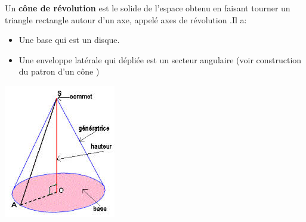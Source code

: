         
Un \textbf{\og cône de révolution \fg{}} est le solide de l'espace obtenu en faisant tourner un triangle rectangle autour d'un axe, appelé \og axes de révolution \fg{}.Il a:
\begin{itemize}
\item Une base qui est un disque.
\item Une enveloppe latérale qui \og dépliée \fg{}  est un secteur angulaire (voir \og construction du patron d'un cône \fg{}) 
\end{itemize}

\includegraphics[scale=0.5]{RepS-cone.jpg} 